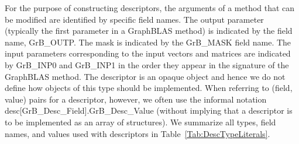 For the purpose of constructing descriptors, the arguments of a method
that can be modified are identified by specific field names. The output
parameter (typically the first parameter in a GraphBLAS method) is
indicated by the field name, {\sf GrB\_OUTP}.  The mask is indicated
by the {\sf GrB\_MASK} field name. The input parameters corresponding
to the input vectors and matrices are indicated by {\sf GrB\_INP0}
and {\sf GrB\_INP1} in the order they appear in the signature of the
GraphBLAS method.  The descriptor is an opaque object and hence we do not
define how objects of this type should be implemented.   When referring to
(field, value) pairs for a descriptor, however, we often use the informal
notation {\sf desc[GrB\_Desc\_Field].GrB\_Desc\_Value} (without implying
that a descriptor is to be implemented as an array of structures).
We summarize all types, field names, and values used with descriptors
in Table~\ref{Tab:DescTypeLiterals}.

